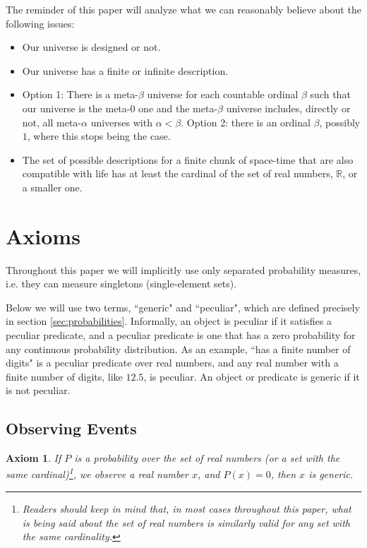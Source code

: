 \documentclass[a4paper
,draft
]{article}
\def\reale{\mathbb{R}}
\newcommand{\ghilimele}[1]{``#1"}
\newtheorem{axiom}{Axiom}
\begin{document}
The reminder of this paper will analyze what we can reasonably believe about
the following issues:
\begin{itemize}
  \item Our universe is designed or not.
  \item Our universe has a finite or infinite description.
  \item Option 1: There is a meta-$\beta$ universe for each countable ordinal
        $\beta$ such that our universe is the meta-$0$ one and the meta-$\beta$
        universe includes, directly or not, all meta-$\alpha$ universes with
        $\alpha < \beta$.
        Option 2: there is an ordinal $\beta$, possibly $1$,
        where this stops being the case.
  \item The set of possible descriptions for a finite chunk of space-time
        that are also compatible with life has at least the cardinal
        of the set of real numbers, $\reale$, or a smaller one.
\end{itemize}

\section{Axioms}
\label{sec:axioms}

Throughout this paper we will implicitly use only separated probability
measures, i.e. they can measure singletons (single-element sets).

Below we will use two terms, \ghilimele{generic} and \ghilimele{peculiar},
which are defined precisely in section \ref{sec:probabilities}. Informally,
an object is peculiar if it satisfies a peculiar predicate, and a peculiar
predicate is one that has a zero probability for any continuous probability
distribution. As an example,
\ghilimele{has a finite number of digits} is a peculiar
predicate over real numbers, and any real number with a finite number
of digits, like $12.5$, is peculiar. An object or predicate is generic if
it is not peculiar.

\subsection{Observing Events}
\begin{axiom}
  \label{ax:zeroisgeneric}
  If $P$ is a probability over the set of real numbers
  (or a set with the same cardinal)\footnote{Readers should
  keep in mind that, in most cases throughout this paper, what is being said
  about the set of real numbers is similarly valid for any set with the same
  cardinality.},
  we observe a real number $x$, and $P(x)=0$, then $x$ is generic.
\end{axiom}
\end{document}
